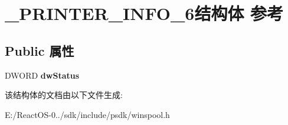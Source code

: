 \hypertarget{struct___p_r_i_n_t_e_r___i_n_f_o__6}{}\section{\+\_\+\+P\+R\+I\+N\+T\+E\+R\+\_\+\+I\+N\+F\+O\+\_\+6结构体 参考}
\label{struct___p_r_i_n_t_e_r___i_n_f_o__6}
\subsection*{Public 属性}
\begin{DoxyCompactItemize}
\item 
\mbox{\label{struct___p_r_i_n_t_e_r___i_n_f_o__6_a09e20c1e772c7a49bd1db84c2dcfbfb5}} 
D\+W\+O\+RD {\bfseries dw\+Status}
\end{DoxyCompactItemize}


该结构体的文档由以下文件生成\+:\begin{DoxyCompactItemize}
\item 
E\+:/\+React\+O\+S-\/0../sdk/include/psdk/winspool.\+h\end{DoxyCompactItemize}
